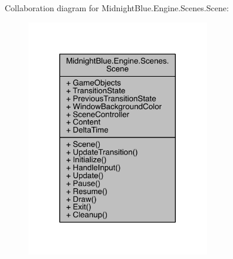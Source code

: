 Collaboration diagram for Midnight\+Blue.\+Engine.\+Scenes.\+Scene\+:
\nopagebreak
\begin{figure}[H]
\begin{center}
\leavevmode
\includegraphics[width=227pt]{class_midnight_blue_1_1_engine_1_1_scenes_1_1_scene__coll__graph}
\end{center}
\end{figure}
